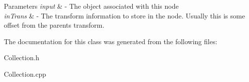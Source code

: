 \begin{DoxyParams}{Parameters}
{\em input} & -\/ The object associated with this node \\
\hline
{\em in\+Trans} & -\/ The transform information to store in the node. Usually this is some offset from the parent\textquotesingle{}s transform. \\
\hline
\end{DoxyParams}


The documentation for this class was generated from the following files\+:\begin{DoxyCompactItemize}
\item 
Collection.\+h\item 
Collection.\+cpp\end{DoxyCompactItemize}
